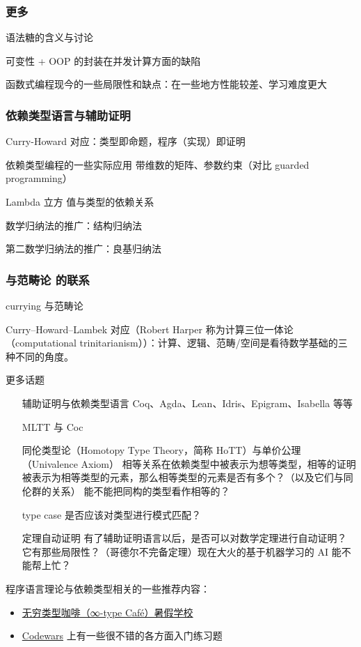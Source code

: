 \documentclass{beamer}
\begin{document}
\begin{frame}
    \frametitle{更多}

    语法糖的含义与讨论

    可变性 + OOP 的封装在并发计算方面的缺陷

    函数式编程现今的一些局限性和缺点：在一些地方性能较差、学习难度更大
\end{frame}


\begin{frame}
    \frametitle{依赖类型语言与辅助证明}

    Curry-Howard 对应：类型即命题，程序（实现）即证明
\end{frame}

\begin{frame}{依赖类型编程的一些实际应用}
    带维数的矩阵、参数约束（对比 guarded programming）
\end{frame}

\begin{frame}{Lambda 立方}
    值与类型的依赖关系
\end{frame}

\begin{frame}{数学归纳法的推广：结构归纳法}

    第二数学归纳法的推广：良基归纳法
\end{frame}

\begin{frame}
    \frametitle{与范畴论 的联系}

    currying 与范畴论

    Curry–Howard–Lambek 对应\cite{curry_howard_wikipedia}（Robert Harper 称为计算三位一体论（computational trinitarianism））：计算、逻辑、范畴/空间是看待数学基础的三种不同的角度。

\end{frame}

\begin{frame}{更多话题}
    \begin{itemize}
        \item[辅助证明与依赖类型语言] Coq、Agda、Lean、Idris、Epigram、Isabella 等等
        \item[MLTT 与 Coc]
        \item[同伦类型论（Homotopy Type Theory，简称 HoTT）与单价公理（Univalence Axiom）] 相等关系在依赖类型中被表示为想等类型，相等的证明被表示为相等类型的元素，那么相等类型的元素是否有多个？（以及它们与同伦群的关系）
            能不能把同构的类型看作相等的？
        \item[type case] 是否应该对类型进行模式匹配？
        \item[定理自动证明] 有了辅助证明语言以后，是否可以对数学定理进行自动证明？它有那些局限性？（哥德尔不完备定理）现在大火的基于机器学习的 AI 能不能帮上忙？
    \end{itemize}
\end{frame}


\begin{frame}
    程序语言理论与依赖类型相关的一些推荐内容：
    \begin{itemize}
        \item \href{https://infinity-type-cafe.github.io/ntype-cafe-summer-school/}{无穷类型咖啡（∞-type Café）暑假学校}
        \item \href{https://www.codewars.com/}{Codewars} 上有一些很不错的各方面入门练习题
    \end{itemize}
\end{frame}

\printbibliography
\end{document}
